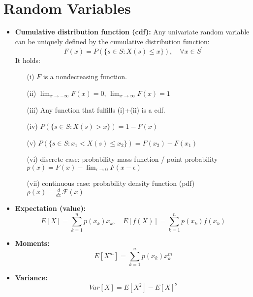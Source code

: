 \section{Random Variables}
\begin{itemize}
\item {\bf Cumulative distribution function (cdf):} 
Any univariate random variable can be uniquely defined by the cumulative distribution function:
$$
F(x) = P(\{s \in S: X(s) \le x\}), \quad \forall x \in S^\prime
$$
It holds:
\begin{itemize}
\item[(i)] $F$ is a nondecreasing function.
\item[(ii)] $\lim_{x\to -\infty} F(x)= 0$, $\lim_{x\to \infty} F(x)= 1$
\item[(iii)] Any function that fulfills (i)+(ii) is a cdf.
\item[(iv)] $ P(\{s \in S: X(s) > x\}) = 1-F(x)$
\item[(v)] $ P(\{s \in S: x_1 < X(s) \le x_2\}) = F(x_2)-F(x_1)$
\item[(vi)] discrete case: probability mass function / point probability $p(x) = F(x) - \lim_{\epsilon \to 0}F(x-\epsilon)$
\item[(vii)] continuous case: probability density function (pdf) $\rho(x) = \frac{d}{dx} \mathcal{F}(x)$
\end{itemize}


\item {\bf Expectation (value):} 
$$
E[X] = \sum_{k=1}^n p(x_k) x_k , \quad E[f(X)] = \sum_{k=1}^n p(x_k) f(x_k) 
$$
\item {\bf Moments:} 
$$
E[X^m] =  \sum_{k=1}^n p(x_k) x_k^m
$$
\item {\bf Variance:} 
$$
Var[X]= E[X^2]-E[X]^2
$$

\end{itemize}
\vfil 


